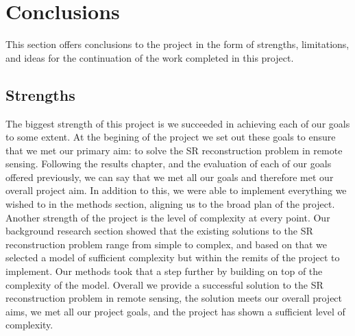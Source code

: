 \section{Conclusions}
This section offers conclusions to the project in the form of strengths, limitations, and ideas for the continuation of the work completed in this project.

\subsection{Strengths}
The biggest strength of this project is we succeeded in achieving each of our goals to some extent. At the begining of the project we set out these goals to ensure that we met our primary aim: to solve the SR reconstruction problem in remote sensing. Following the results chapter, and the evaluation of each of our goals offered previously, we can say that we met all our goals and therefore met our overall project aim. In addition to this, we were able to implement everything we wished to in the methods section, aligning us to the broad plan of the project. Another strength of the project is the level of complexity at every point. Our background research section showed that the existing solutions to the SR reconstruction problem range from simple to complex, and based on that we selected a model of sufficient complexity but within the remits of the project to implement. Our methods took that a step further by building on top of the complexity of the model. Overall we provide a successful solution to the SR reconstruction problem in remote sensing, the solution meets our overall project aims, we met all our project goals, and the project has shown a sufficient level of complexity.

